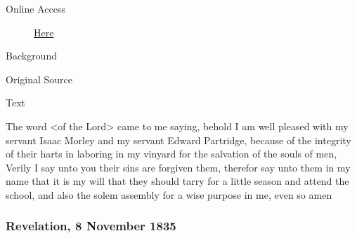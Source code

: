 			\begin{description}
				\item[Online Access] \href{https://www.josephsmithpapers.org/paper-summary/revelation-7-november-1835/1}{Here}
			\end{description}
			
			\begin{description}
				\item[Background]
			\end{description}
			
			
			\begin{description}
				\item[Original Source]
			\end{description}
			
			
			\begin{description}
				\item[Text]
			\end{description}
			
				The word <of the Lord> came to me saying, behold I am well pleased with my servant Isaac Morley and my servant Edward Partridge, because of the integrity of their harts in laboring in my vinyard for the salvation of the souls of men, Verily I say unto you their sins are forgiven them, therefor say unto them in my name that it is my will that they should tarry for a little season and attend the school, and also the solem assembly for a wise purpose in me, even so amen
				
		\subsubsection{Revelation, 8 November 1835}
			\label{EMS-1835-JS-8-NOV-1835}
			
